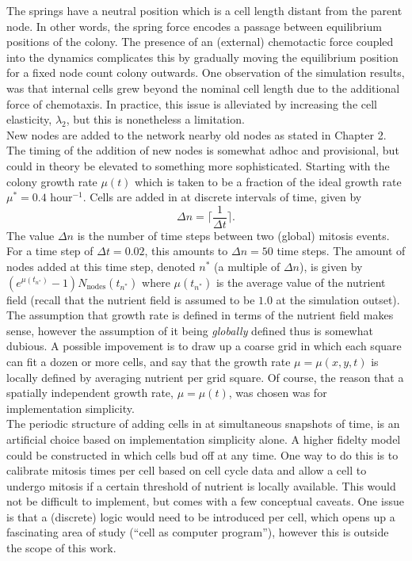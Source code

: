 The springs have a neutral position which is a cell length distant from the parent node.
In other words, the spring force encodes a passage between equilibrium positions of the colony.
The presence of an (external) chemotactic force coupled into the dynamics complicates 
this by gradually moving the equilibrium position for a fixed node count colony outwards.
One observation of the simulation results, was that internal cells grew beyond the nominal cell length
due to the additional force of chemotaxis. In practice,
this issue is alleviated by increasing the cell elasticity, $\lambda_2$, but this 
is nonetheless a limitation.
\\

New nodes are added to the network nearby old nodes as stated in Chapter 2. The timing
of the addition of new nodes is somewhat adhoc and provisional, but could in theory
be elevated to something more sophisticated. Starting with the colony growth rate 
$\mu(t)$ which is taken to be a fraction of the ideal growth rate $\mu^* = 0.4$ hour$^{-1}$.
Cells are added in at discrete intervals of time, given by 
\begin{equation*}
    \Delta n = \bigg\lceil \frac{1}{\Delta t} \bigg\rceil.
\end{equation*}
The value $\Delta n$ is the number of time steps between two (global) mitosis events. For a
time step of $\Delta t = 0.02$, this amounts to $\Delta n = 50$ time steps. The amount of 
nodes added at this time step, denoted $n^*$ (a multiple of $\Delta n$), is given by 
$(e^{\mu(t_{n^*})} -1) N_{\textrm{nodes}}(t_{n^*})$ where $\mu (t_{n^*})$ 
is the average value of the nutrient field (recall that the nutrient field is assumed to 
be $1.0$ at the simulation outset). The assumption that growth rate is defined
in terms of the nutrient field makes sense, however the assumption of it being \textit{globally} 
defined thus is somewhat dubious. A possible impovement is to draw up a coarse 
grid in which each square can fit a dozen or more cells, and say that 
the growth rate $\mu = \mu(x,y,t)$ is locally defined by averaging nutrient per grid square. 
Of course, the reason 
that a spatially independent growth rate, $\mu = \mu(t)$, was chosen was for 
implementation simplicity.
\\

The periodic structure of adding cells in at simultaneous snapshots of time,
is an artificial choice based on implementation simplicity alone. 
A higher fidelty model could be constructed in which cells bud off at any time.
One way to do this is to calibrate mitosis times per cell based on cell cycle data
and allow a cell to undergo mitosis if a certain threshold of nutrient is locally
available. This would not be difficult to implement, but 
comes with a few conceptual caveats. One issue is that 
a (discrete) logic would need to be introduced per cell,
which opens up a fascinating area of study (``cell as computer program''), however 
this is outside the scope of this work.
\\

